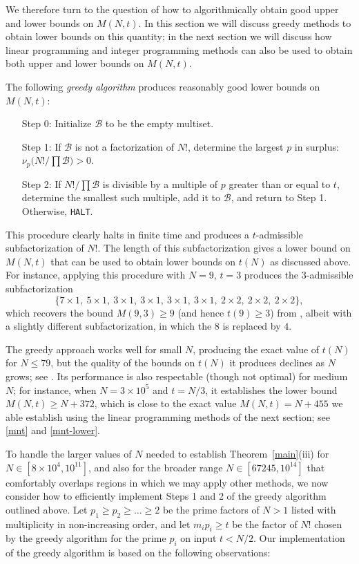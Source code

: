 \documentclass[12pt,a4paper,reqno]{amsart}
\numberwithin{equation}{section}
\theoremstyle{plain}
\theoremstyle{definition}
\newcommand\tuple{{\mathcal B}}
\begin{document}
We therefore turn to the question of how to algorithmically obtain good upper and lower bounds on $M(N,t)$.  In this section we will discuss greedy methods to obtain lower bounds on this quantity; in the next section we will discuss how linear programming and integer programming methods can also be used to obtain both upper and lower bounds on $M(N,t)$.

The following \textit{greedy algorithm} produces reasonably good lower bounds on $M(N,t)$:

\begin{enumerate}
\setlength{\itemsep}{2pt}
\item[Step 0:] Initialize $\tuple$ to be the empty multiset. 
\item[Step 1:] If $\tuple$ is not a factorization of $N!$, determine the largest $p$ in surplus: $\nu_p\bigl(N!/\prod \tuple\bigr) > 0$. 
\item[Step 2:] If $N! / \prod \tuple$ is divisible by a multiple of $p$ greater than or equal to $t$, determine the smallest such multiple, add it to $\tuple$, and return to Step 1.  Otherwise, \texttt{HALT}. 
\end{enumerate}

This procedure clearly halts in finite time and produces a $t$-admissible subfactorization of $N!$.
The length of this subfactorization gives a lower bound on $M(N,t)$ that can be used to obtain lower bounds on $t(N)$ as discussed above.  For instance, applying this procedure with $N=9$, $t=3$ produces the $3$-admissible subfactorization
\[
\bigl\{7 \times 1,\ 5 \times 1,\ 3 \times 1,\ 3 \times 1,\ 3 \times 1,\ 3 \times 1,\ 2 \times 2,\ 2 \times 2,\ 2 \times 2 \bigr\},
\]
which recovers the bound $M(9,3) \geq 9$ (and hence $t(9) \geq 3$) from , albeit with a slightly different subfactorization, in which the $8$ is replaced by $4$.

The greedy approach works well for small $N$, producing the exact value of $t(N)$ for $N \leq 79$, but the quality of the bounds on $t(N)$ it produces declines as $N$ grows; see .  Its performance is also respectable (though not optimal) for medium $N$; for instance, when $N=3 \times 10^5$ and $t=N/3$, it establishes the lower bound $M(N,t) \geq N+372$, which is close to the exact value $M(N,t) = N+455$ we able establish using the linear programming methods of the next section; see \eqref{mnt} and \eqref{mnt-lower}.

To handle the larger values of $N$ needed to establish Theorem~\ref{main}(iii) for $N\in [ 8\times 10^4, 10^{11}]$, and also for the broader range $N\in [67245,10^{14}]$ that comfortably overlaps regions in which we may apply other methods, we now consider how to efficiently implement Steps 1 and 2 of the greedy algorithm outlined above.  Let $p_1\ge p_2\ge \ldots \ge 2$ be the prime factors of $N>1$ listed with multiplicity in non-increasing order, and let $m_ip_i\ge t$ be the factor of $N!$ chosen by the greedy algorithm for the prime $p_i$ on input $t < N/2$.  Our implementation of the greedy algorithm is based on the following observations:
\end{document}
